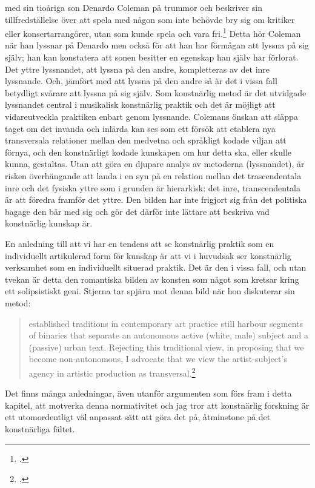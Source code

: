 \documentclass[11pt]{article}
\begin{document}
med sin tioåriga son Denardo Coleman på trummor och beskriver sin
tillfredställelse över att spela med någon som inte behövde bry sig om
kritiker eller konsertarrangörer, utan som kunde spela och vara
fri.\footcite[sid. 121]{litzweiler92} Detta hör Coleman när han lyssnar
på Denardo men också för att han har förmågan att lyssna på sig själv;
han kan konstatera att sonen besitter en egenskap han själv har
förlorat. Det yttre lyssnandet, att lyssna på den andre, kompletteras
av det inre lyssnande. Och, jämfört med att lyssna på den andre så är
det i vissa fall betydligt svårare att lyssna på sig själv. Som
konstnärlig metod är det utvidgade lyssnandet central i musikalisk
konstnärlig praktik och det är möjligt att vidareutveckla praktiken
enbart genom lyssnande. Colemans önskan att släppa taget om det
invanda och inlärda kan ses som ett försök att etablera nya
transversala relationer mellan den medvetna och språkligt kodade
viljan att förnya, och den konstnärligt kodade kunskapen om hur detta
ska, eller skulle kunna, gestaltas. Utan att göra en djupare analys av
metoderna (lyssnandet), är risken överhängande att landa i en syn på
en relation mellan det trascendentala inre och det fysiska yttre som i
grunden är hierarkisk: det inre, transcendentala är att föredra
framför det yttre. Den bilden har inte frigjort sig från det politiska
bagage den bär med sig och gör det därför inte lättare att beskriva
vad konstnärlig kunskap är.

En anledning till att vi har en tendens att se konstnärlig praktik som
en individuellt artikulerad form för kunskap är att vi i huvudsak ser
konstnärlig verksamhet som en individuellt situerad praktik. Det är
den i vissa fall, och utan tvekan är detta den romantiska
bilden av konsten som något som kretsar kring ett solipsistiskt
geni. Stjerna tar spjärn mot denna bild när hon diskuterar sin metod:
\begin{quote}
    established traditions in contemporary art practice still harbour
    segments of binaries that separate an autonomous active (white,
    male) subject and a (passive) urban text. Rejecting this
    traditional view, in proposing that we become non-autonomous, I
    advocate that we view the artist-subject’s agency in artistic
    production as transversal.\footcite[sid. 119-20]{Stjerna2018}
\end{quote}
Det finns många anledningar, även utanför argumenten som förs fram i
detta kapitel, att motverka denna normativitet och jag tror att
konstnärlig forskning är ett utomordentligt väl anpassat sätt att göra
det på, åtminstone på det konstnärliga fältet.
\end{document}
